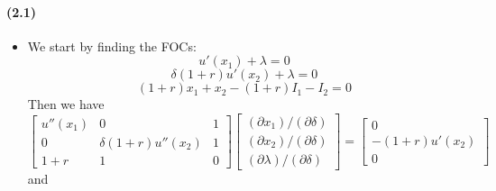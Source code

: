 \documentclass[10pt,letter]{article}
\begin{document}
\paragraph{(2.1)}
\begin{itemize}
\item We start by finding the FOCs:
\[ u'(x_1) + \lambda = 0 \]
\[ \delta(1+r) u'(x_2) + \lambda = 0 \]
\[(1+r)x_1 + x_2 - (1+r)I_1 - I
_2 = 0 \]
Then we have
\[ \begin{bmatrix}
u''(x_1) & 0 & 1 \\
0 &  \delta (1+r) u''(x_2) & 1 \\
1+r & 1 & 0
\end{bmatrix} \begin{bmatrix} (\partial x_1)/(\partial \delta) \\ (\partial x_2)/(\partial \delta) \\ (\partial \lambda)/(\partial \delta) \end{bmatrix} = \begin{bmatrix} 0 \\ -(1+r)u'(x_2) \\ 0 \end{bmatrix} \]
and


\end{itemize}
\end{document}
